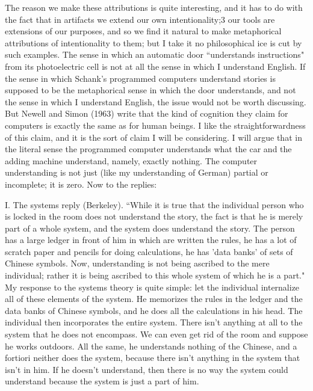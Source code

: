 The reason we make these attributions is quite interesting, and it has to do with the fact that in artifacts we
extend our own intentionality;3 our tools are extensions of our purposes, and so we find it natural to make
metaphorical attributions of intentionality to them; but I take it no philosophical ice is cut by such examples. The
sense in which an automatic door ``understands instructions" from its photoelectric cell is not at all the sense in
which I understand English. If the sense in which Schank's programmed computers understand stories is
supposed to be the metaphorical sense in which the door understands, and not the sense in which I understand
English, the issue would not be worth discussing. But Newell and Simon (1963) write that the kind of cognition
they claim for computers is exactly the same as for human beings. I like the straightforwardness of this claim,
and it is the sort of claim I will be considering. I will argue that in the literal sense the programmed computer
understands what the car and the adding machine understand, namely, exactly nothing. The computer
understanding is not just (like my understanding of German) partial or incomplete; it is zero.
Now to the replies:

I. The systems reply (Berkeley). ``While it is true that the individual person who is locked in the room does not
understand the story, the fact is that he is merely part of a whole system, and the system does understand the
story. The person has a large ledger in front of him in which are written the rules, he has a lot of scratch paper
and pencils for doing calculations, he has 'data banks' of sets of Chinese symbols. Now, understanding is not
being ascribed to the mere individual; rather it is being ascribed to this whole system of which he is a part."
My response to the systems theory is quite simple: let the individual internalize all of these elements of the
system. He memorizes the rules in the ledger and the data banks of Chinese symbols, and he does all the
calculations in his head. The individual then incorporates the entire system. There isn't anything at all to the
system that he does not encompass. We can even get rid of the room and suppose he works outdoors. All the
same, he understands nothing of the Chinese, and a fortiori neither does the system, because there isn't anything
in the system that isn't in him. If he doesn't understand, then there is no way the system could understand
because the system is just a part of him.


